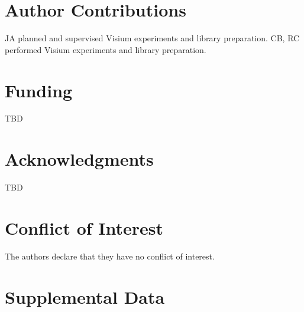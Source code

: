 \documentclass[utf8]{FrontiersinHarvard} %
\begin{document}

\section*{Author Contributions}

JA planned and supervised Visium experiments and library preparation.
CB, RC performed Visium experiments and library preparation.


\section*{Funding}
TBD

\section*{Acknowledgments}
TBD

\section*{Conflict of Interest}
The authors declare that they have no conflict of interest.


\section*{Supplemental Data}

\end{document}
